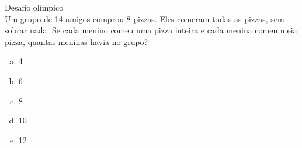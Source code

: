 \documentclass[a4paper,14pt]{article}
\begin{document}
\begin{multicols}{2}
\begin{enumerate}
			Desafio olímpico \\
			Um grupo de 14 amigos comprou 8 pizzas. Eles comeram todas as pizzas, sem sobrar nada. Se cada menino comeu uma pizza inteira e cada menina comeu meia pizza, quantas meninas havia no grupo?
			\begin{enumerate}[a)]
				\item 4
				\item 6
				\item 8
				\item 10
				\item 12 \\\\\\\\\\\\\\\\

\end{enumerate}
\end{enumerate}
\end{multicols}
\end{document}
